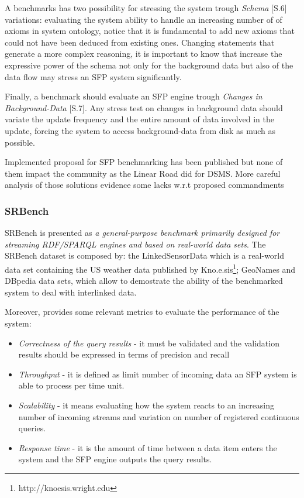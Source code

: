 A benchmarks has two possibility for stressing the system trough \textit{Schema} [S.6] variations: evaluating the system ability to handle an increasing number of of axioms in system ontology, notice that it is fundamental to add new axioms that could not have been deduced from existing ones. Changing statements that generate a more complex reasoning, it is important to know that increase the expressive power of the schema not only for the background data but also of the data flow may stress an SFP system significantly.

Finally, a benchmark should evaluate an SFP engine trough \textit{Changes in Background-Data} [S.7]. Any stress test on changes in background data should variate the update frequency and the entire amount of data involved in the update, forcing the system to access background-data from disk as much as possible.

Implemented proposal for SFP benchmarking has been published but none of them impact the community as the Linear Road did for DSMS. More careful analysis of those solutions evidence some lacks w.r.t proposed commandments \cite{DBLP:conf/esws/ScharrenbachUMVB13} 

\subsubsection{SRBench}\label{sec:srbench}

SRBench is presented as \textit{a general-purpose benchmark primarily designed for streaming RDF/SPARQL engines and based on real-world data sets}\cite{Zhang2012}. The SRBench dataset is composed by: the LinkedSensorData  which  is a real-world data set containing the US weather data published by Kno.e.sis\footnote{ http://knoesis.wright.edu};  GeoNames and DBpedia data sets, which allow to demostrate the ability of the benchmarked system to deal with interlinked data.

Moreover, \cite{Zhang2012} provides some relevant metrics to evaluate the performance of the system: \begin{itemize}
\item \textit{Correctness of the query results} - it must be validated and the validation results should be expressed in terms of precision and recall
\item \textit{Throughput} - it is defined as limit number of incoming data  an SFP system is able to process per time unit.
\item \textit{Scalability} - it means evaluating how the system reacts to an increasing number of incoming streams and variation on number of registered continuous queries.
\item \textit{Response time} - it is the amount of time between a data item enters the system and the SFP engine outputs the query results.
\end{itemize}

